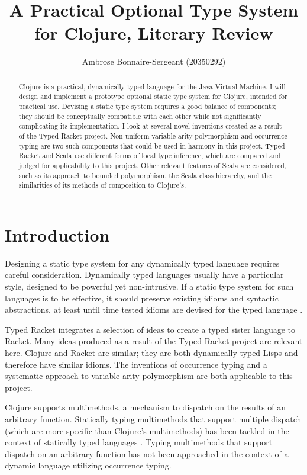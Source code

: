 \documentclass[12pt, a4paper]{article}
\title{A Practical Optional Type System for Clojure, Literary Review}
\author{Ambrose Bonnaire-Sergeant (20350292)}
\begin{document}
\maketitle

\begin{abstract}
Clojure is a practical, dynamically typed language for the Java Virtual Machine.
I will design and implement a prototype optional static type 
system for Clojure, intended for practical use. Devising a static type system 
requires a good balance of components; they should be conceptually compatible with each other
while not significantly complicating its implementation.
I look at several novel inventions created as a result 
of the Typed Racket project.
Non-uniform variable-arity polymorphism and occurrence typing are two such
components that could be used in harmony in this project.
Typed Racket and Scala use different forms of local type inference,
which are compared and judged for applicability to this project.
Other relevant features of Scala are considered, such as its approach to bounded polymorphism,
the Scala class hierarchy, and the similarities of its methods of composition to Clojure's.
\end{abstract}

\tableofcontents

\section{Introduction}

Designing a static type system for any dynamically typed language requires
careful consideration. Dynamically typed languages usually have a particular
style, designed to be powerful yet non-intrusive. If a static type system
for such languages is to be effective, it should preserve existing idioms and
syntactic abstractions, at least until time tested idioms are devised for
the typed language \cite{SAMTH:dissertation} .

Typed Racket \cite{SAMTH:dissertation} integrates a selection of ideas to
create a typed sister language to Racket. 
Many ideas produced as a result of the Typed Racket project are relevant here.
Clojure and Racket are similar; they are both dynamically typed Lisps
and therefore have similar idioms. The inventions of
occurrence typing \cite{Tobin-Hochstadt:2010:LTU:1932681.1863561}
and a systematic approach to variable-arity polymorphism
\cite{Strickland:2009:PVP:1532974.1532978}
are both applicable to this project.

Clojure supports multimethods, a mechanism to dispatch on the
results of an arbitrary function. Statically typing multimethods that support
multiple dispatch (which are more specific than Clojure's multimethods) has been tackled
in the context of statically typed languages
\cite{Millstein02modularstatically}
. Typing multimethods that support dispatch on an arbitrary function
has not been approached in the context of a dynamic language utilizing 
occurrence typing.
\end{document}
